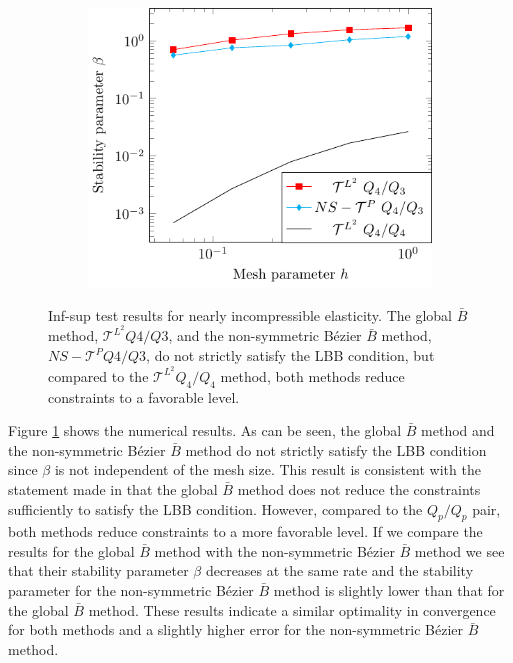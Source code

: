 \documentclass{article}
\newcommand{\Bezier}{{B\'{e}zier} }
\begin{document}
\begin{figure}[htb!]
\begin{subfigure}[b]{0.31\linewidth}
    \end{subfigure}
    \begin{subfigure}[b]{0.31\linewidth}        %
        \centering
        \includegraphics[width=\linewidth]{beta_p_4}
    \end{subfigure}

    \caption{Inf-sup test results for nearly incompressible elasticity. The global $\bar{B}$ method, $\mathcal{T}^{L^2} Q4/Q3$, and the non-symmetric \Bezier $\bar{B}$ method, $NS - \mathcal{T}^P Q4/Q3$, do not strictly satisfy the LBB condition, but compared to the $\mathcal{T}^{L^2} Q_4/Q_4$ method, both methods reduce constraints to a favorable level. }
    \label{fig:inf_sup}
\end{figure}

Figure \ref{fig:inf_sup} shows the numerical results. As can be seen, the global $\bar{B}$ method and the non-symmetric \Bezier $\bar{B}$ method do not strictly satisfy the LBB condition since $\beta$ is not independent of the mesh size. This result is consistent with the statement made in \cite{elguedj:hal-00457010} that the global $\bar{B}$ method does not reduce the constraints sufficiently to satisfy the LBB condition. However, compared to the $Q_p/Q_p$ pair, both methods reduce constraints to a more favorable level. If we compare the results for the global $\bar{B}$ method with the non-symmetric \Bezier $\bar{B}$ method we see that their stability parameter $\beta$ decreases at the same rate and the stability parameter for the non-symmetric \Bezier $\bar{B}$ method is slightly lower than that for the global $\bar{B}$ method. These results indicate a similar optimality in convergence for both methods and a slightly higher error for the non-symmetric \Bezier $\bar{B}$ method.
\end{document}
